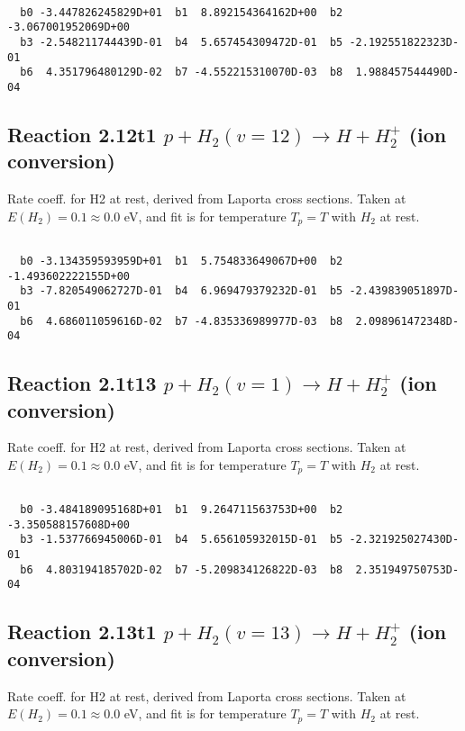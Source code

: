 \begin{small}\begin{verbatim}

  b0 -3.447826245829D+01  b1  8.892154364162D+00  b2 -3.067001952069D+00
  b3 -2.548211744439D-01  b4  5.657454309472D-01  b5 -2.192551822323D-01
  b6  4.351796480129D-02  b7 -4.552215310070D-03  b8  1.988457544490D-04

\end{verbatim}\end{small}

\newpage
\subsection{
Reaction 2.12t1
$ p + H_2(v=12) \rightarrow H + H_2^+$ (ion conversion)
}
Rate coeff. for H2 at rest, derived from Laporta cross sections.
Taken at $E(H_2) = 0.1 \approx 0.0$ eV,  and fit is for temperature $T_p=T$ with $H_2$ at rest.

\begin{small}\begin{verbatim}

  b0 -3.134359593959D+01  b1  5.754833649067D+00  b2 -1.493602222155D+00
  b3 -7.820549062727D-01  b4  6.969479379232D-01  b5 -2.439839051897D-01
  b6  4.686011059616D-02  b7 -4.835336989977D-03  b8  2.098961472348D-04

\end{verbatim}\end{small}

\newpage
\subsection{
Reaction 2.1t13
$ p + H_2(v=1) \rightarrow H + H_2^+$ (ion conversion)
}
Rate coeff. for H2 at rest, derived from Laporta cross sections.
Taken at $E(H_2) = 0.1 \approx 0.0$ eV,  and fit is for temperature $T_p=T$ with $H_2$ at rest.

\begin{small}\begin{verbatim}

  b0 -3.484189095168D+01  b1  9.264711563753D+00  b2 -3.350588157608D+00
  b3 -1.537766945006D-01  b4  5.656105932015D-01  b5 -2.321925027430D-01
  b6  4.803194185702D-02  b7 -5.209834126822D-03  b8  2.351949750753D-04

\end{verbatim}\end{small}

\newpage
\subsection{
Reaction 2.13t1
$ p + H_2(v=13) \rightarrow H + H_2^+$ (ion conversion)
}
Rate coeff. for H2 at rest, derived from Laporta cross sections.
Taken at $E(H_2) = 0.1 \approx 0.0$ eV,  and fit is for temperature $T_p=T$ with $H_2$ at rest.

